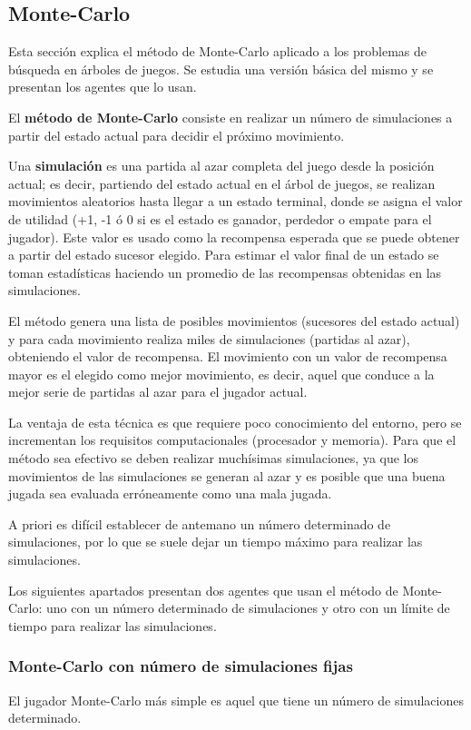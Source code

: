 \subsection{Monte-Carlo}
\label{ssec:montecarlo}
Esta sección explica el método de Monte-Carlo aplicado a los problemas de búsqueda en árboles de juegos.
Se estudia una versión básica del mismo y se presentan los agentes que lo usan.

El \textbf{método de Monte-Carlo} consiste en realizar un número de simulaciones a partir del estado actual para decidir el próximo movimiento.

Una \textbf{simulación} es una partida al azar completa del juego desde la posición actual; es decir, partiendo del estado actual en el árbol de juegos, se realizan movimientos aleatorios hasta llegar a un estado terminal, donde se asigna el valor de utilidad (+1, -1 ó 0 si es el estado es ganador, perdedor o empate para el jugador).
Este valor es usado como la recompensa esperada que se puede obtener a partir del estado sucesor elegido.
Para estimar el valor final de un estado se toman estadísticas haciendo un promedio de las recompensas obtenidas en las simulaciones.

El método genera una lista de posibles movimientos (sucesores del estado actual) y para cada movimiento realiza miles de simulaciones (partidas al azar), obteniendo el valor de recompensa.
El movimiento con un valor de recompensa mayor es el elegido como mejor movimiento, es decir, aquel que conduce a la mejor serie de partidas al azar para el jugador actual.

La ventaja de esta técnica es que requiere poco conocimiento del entorno, pero se incrementan los requisitos computacionales (procesador y memoria).
Para que el método sea efectivo se deben realizar muchísimas simulaciones, ya que los movimientos de las simulaciones se generan al azar y es posible que una buena jugada sea evaluada erróneamente como una mala jugada.

A priori es difícil establecer de antemano un número determinado de simulaciones, por lo que se suele dejar un tiempo máximo para realizar las simulaciones.

\bigskip
Los siguientes apartados presentan dos agentes que usan el método de Monte-Carlo: uno con un número determinado de simulaciones y otro con un límite de tiempo para realizar las simulaciones.

\subsubsection{Monte-Carlo con número de simulaciones fijas}
\label{sssec:montecarlo_simulaciones}
El jugador Monte-Carlo más simple es aquel que tiene un número de simulaciones determinado.

